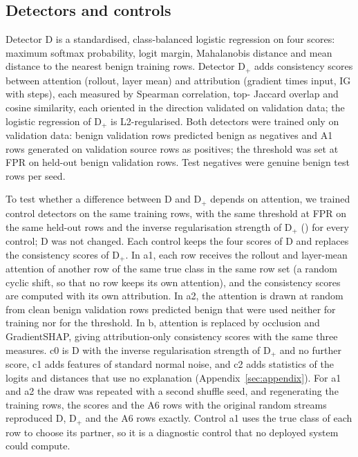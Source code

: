 \subsection{Detectors and controls}
\label{sec:detectors}
Detector D is a standardised, class-balanced logistic regression on four scores: maximum softmax probability, logit
margin, Mahalanobis distance and mean distance to the \paramKnn{} nearest benign training rows.
Detector D$_+$ adds \nConsistency{} consistency scores between attention (rollout, layer mean) and attribution (gradient
times input, IG with \paramIGDet{} steps), each measured by Spearman correlation, top-\paramTopK{} Jaccard overlap and
cosine similarity, each oriented in the direction validated on validation data; the logistic regression of D$_+$ is
L2-regularised.
Both detectors were trained only on validation data: \paramNegTrain{} benign validation rows predicted benign as
negatives and A1 rows generated on validation source rows as positives; the threshold was set at \paramFPR{} FPR on
\paramNegHeld{} held-out benign validation rows.
Test negatives were \paramNegTest{} genuine benign test rows per seed.

To test whether a difference between D and D$_+$ depends on attention, we trained \nControlsAll{} control detectors on
the same training rows, with the same threshold at \paramFPR{} FPR on the same held-out rows and the inverse
regularisation strength of D$_+$ (\apCplus) for every control; D was not changed.
Each control keeps the four scores of D and replaces the \nConsistency{} consistency scores of D$_+$.
In a1, each row receives the rollout and layer-mean attention of another row of the same true class in the same row set
(a random cyclic shift, so that no row keeps its own attention), and the consistency scores are computed with its own
attribution.
In a2, the attention is drawn at random from clean benign validation rows predicted benign that were used neither for
training nor for the threshold.
In b, attention is replaced by occlusion and GradientSHAP, giving \nConsistency{} attribution-only consistency scores
with the same three measures.
c0 is D with the inverse regularisation strength of D$_+$ and no further score, c1 adds \nConsistency{} features of
standard normal noise, and c2 adds \nConsistency{} statistics of the logits and distances that use no explanation
(Appendix~\ref{sec:appendix}).
For a1 and a2 the draw was repeated with a second shuffle seed, and regenerating the training rows, the scores and the
A6 rows with the original random streams reproduced D, D$_+$ and the A6 rows exactly.
Control a1 uses the true class of each row to choose its partner, so it is a diagnostic control that no deployed
system could compute.

